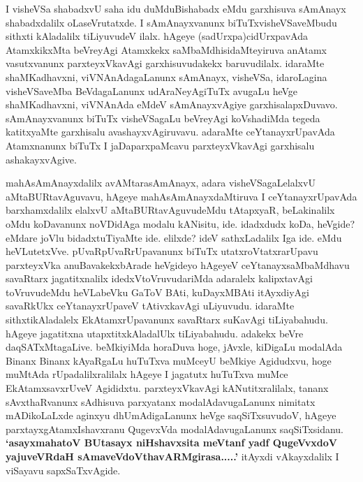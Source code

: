 \begin{artha}
I visheVSa shabadxvU saha idu duMduBishabadx eMdu garxhisuva sAmAnayx
shabadxdalilx oLaseVrutatxde. I sAmAnayxvanunx biTuTxvisheVSaveMbudu
sithxti kAladalilx tiLiyuvudeV ilalx. hAgeye (sadUrxpa)cidUrxpavAda
AtamxkikxMta beVreyAgi Atamxkekx saMbaMdhisidaMteyiruva anAtamx
vasutxvanunx parxteyxVkavAgi garxhisuvudakekx baruvudilalx. idaraMte
shaMKadhavxni, viVNAnAdagaLanunx sAmAnayx, visheVSa, idaroLagina
visheVSaveMba BeVdagaLanunx udAraNeyAgiTuTx avugaLu heVge
shaMKadhavxni, viVNAnAda eMdeV sAmAnayxvAgiye
garxhisalapxDuvavo. sAmAnayxvanunx biTuTx visheVSagaLu beVreyAgi
koVshadiMda tegeda katitxyaMte garxhisalu avashayxvAgiruvavu. adaraMte
ceYtanayxrUpavAda Atamxnanunx biTuTx I jaDaparxpaMcavu parxteyxVkavAgi
garxhisalu ashakayxvAgive.

mahAsAmAnayxdalilx avAMtarasAmAnayx, adara visheVSagaLelalxvU
aMtaBURtavAguvavu, hAgeye mahAsAmAnayxdaMtiruva I ceYtanayxrUpavAda
barxhamxdalilx elalxvU aMtaBURtavAguvudeMdu tAtapxyaR, beLakinalilx
oMdu koDavanunx noVDidAga modalu kANisitu, ide. idadxdudx koDa, heVgide?
eMdare joVlu bidadxtuTiyaMte ide. elilxde? ideV sathxLadalilx Iga
ide. eMdu heVLutetxVve. pUvaRpUvaRrUpavanunx biTuTx
utatxroVtatxrarUpavu parxteyxVka anuBavakekxbArade heVgideyo hAgeyeV
ceYtanayxsaMbaMdhavu savaRtarx jagatitxnalilx idedxVtoVruvudariMda
adaralelx kalipxtavAgi toVruvudeMdu heVLabeVku GaToV BAti, kuDayxMBAti
itAyxdiyAgi savaRkUkx ceYtanayxrUpaveV tAtivxkavAgi uLiyuvudu. idaraMte
sithxtikAladalelx EkAtamxrUpavanunx savaRtarx suKavAgi
tiLiyabahudu. hAgeye jagatitxna utapxtitxkAladalUlx
tiLiyabahudu. adakekx beVre daqSATxMtagaLive. beMkiyiMda horaDuva
hoge, jAvxle, kiDigaLu modalAda Binanx Binanx kAyaRgaLu huTuTxva muMceyU
beMkiye Agidudxvu, hoge muMtAda rUpadalilxralilalx hAgeye I jagatutx
huTuTxva muMce EkAtamxsavxrUveV Agididxtu. parxteyxVkavAgi
kANutitxralilalx, tananx sAvxthaRvanunx sAdhisuva parxyatanx
modalAdavugaLanunx nimitatx mADikoLaLxde aginxyu dhUmAdigaLanunx heVge
saqSiTxsuvudoV, hAgeye parxtayxgAtamxIshavxranu QugevxVda
modalAdavugaLanunx saqSiTxsidanu. \textbf{`asayxmahatoV BUtasayx niHshavxsita meVtanf yadf QugeVvxdoV yajuveVRdaH sAmaveVdoV\s thavARMgirasa.....'} itAyxdi vAkayxdalilx I
viSayavu sapxSaTxvAgide.
\end{artha}

\centerline{}

